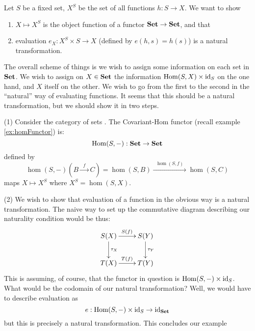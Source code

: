 \begin{ex}\label{ex:naturalTransformation}
Let $S$ be a fixed set, $X^{S}$ be the set of all functions
$h:S\to X$. We want to show
\begin{enumerate}
\item $X\mapsto X^{S}$ is the object function of a functor
  $\mathbf{Set}\to\mathbf{Set}$, and that
\item evaluation $e_{X}:X^{S}\times S\to X$ (defined by
  $e(h,s)=h(s)$) is a natural transformation.
\end{enumerate}
The overall scheme of things is we wish to assign some
information on each set in $\mathbf{Set}$. We wish to assign on
$X\in\mathbf{Set}$ the information $\operatorname{Hom}(S,X)\times\operatorname{id}_{S}$ on the one
hand, and $X$ itself on the other. We wish to go from the first
to the second in the ``natural'' way of evaluating functions. It
seems that this should be a natural transformation, but we should
show it in two steps.

(1) Consider the category of sets . The Covariant-Hom
functor (recall example \ref{ex:homFunctor}) is:
\begin{equation}%
\hom(S,-):\ms{Set}\to\ms{Set}
\end{equation}
defined by
\begin{equation}%
\hom(S,-)\left(B\xrightarrow{\;\;f\;\;}C\right)=\hom(S,B)\xrightarrow{\;\;\hom(S,f)\;\;}\hom(S,C)
\end{equation}
maps $X\mapsto X^{S}$ where $X^{S}=\hom(S,X)$.

\noindent(2) We wish to show that evaluation of a function in the
obvious way is a natural transformation. The naive way to set up
the commutative diagram describing our naturality condition would
be thus:
\begin{equation}
\vcenter{
\xymatrix{
S(X)\ar[d]^{\tau_{X}} \ar[r]^{S(f)} & S(Y)\ar[d]^{\tau_{Y}}\\
T(X)\ar[r]^{T(f)} & T(Y)
}}
\end{equation}
\noindent This is assuming, of course, that the functor in
question is $\operatorname{Hom}(S,-)\times\operatorname{id}_{S}$. What would be the codomain
of our natural transformation? Well, we would have to describe
evaluation as
\begin{equation}%
e:\hom(S,-)\times\id{S}\to\id{\ms{Set}}
\end{equation}
but this is precisely a natural transformation. This concludes
our example
\end{ex}

